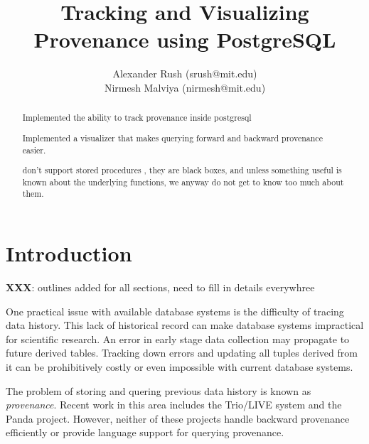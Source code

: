\documentclass[11pt]{article}
\title{Tracking and Visualizing Provenance using PostgreSQL}
\author{Alexander Rush (srush@mit.edu)\\ Nirmesh Malviya (nirmesh@mit.edu)}
\begin{document}
\maketitle

\begin{abstract}

Implemented the ability to track provenance inside postgresql

Implemented a visualizer that makes querying forward and backward provenance easier.

don't support stored procedures , they are black boxes, and unless something useful is known about the underlying functions, we anyway do not get to know too much about them.
% 
\end{abstract}

\section{Introduction}

\textbf{XXX}: outlines added for all sections, need to fill in details everywhree


One practical issue with available database systems is the difficulty of tracing data history. This lack of historical record can make database systems impractical for scientific research. An error in early stage data collection may propagate to future derived tables. Tracking down errors and updating all tuples derived from it can be prohibitively costly or even impossible with current database systems. 

The problem of storing and quering previous data history is known as \emph{provenance}. Recent work in this area includes the Trio/LIVE system and the Panda project. However, neither of these projects handle backward provenance efficiently or provide language support for querying provenance.
\end{document}
